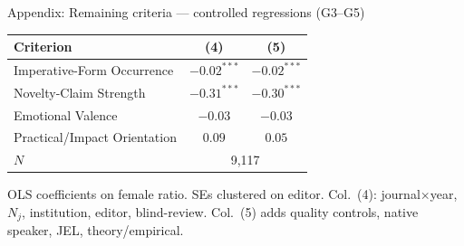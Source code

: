 \documentclass[aspectratio=169,11pt]{beamer}
\begin{document}
\begin{frame}{Appendix: Remaining criteria — controlled regressions (G3--G5)}
    \vfill
    \begin{center}
    {\small
    \begin{tabular}{lcc}
        \toprule
        Criterion & (4) & (5) \\
        \midrule
        Imperative-Form Occurrence        & $-0.02^{***}$ & $-0.02^{***}$ \\
        Novelty-Claim Strength            & $-0.31^{***}$ & $-0.30^{***}$ \\
        Emotional Valence                 & $-0.03$       & $-0.03$       \\
        Practical/Impact Orientation      & $0.09$        & $0.05$        \\
        \midrule
        $N$                               & \multicolumn{2}{c}{9,117} \\
        \bottomrule
    \end{tabular}
    }
    \end{center}
    \vspace{0.2cm}
    \begin{center}
        {\small\color{WarmGray}
        OLS coefficients on female ratio. SEs clustered on editor.
        Col.~(4): journal$\times$year, $N_j$, institution, editor, blind-review.
        Col.~(5) adds quality controls, native speaker, JEL, theory/empirical.}
    \end{center}
    \vfill
\end{frame}
\end{document}
